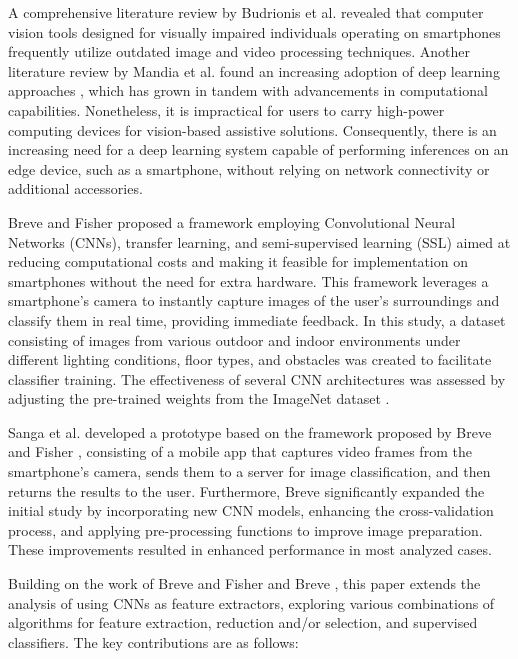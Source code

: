 \documentclass[preprint,12pt]{elsarticle}
\begin{document}
A comprehensive literature review by Budrionis et al. \cite{budrionis2022} revealed that computer vision tools designed for visually impaired individuals operating on smartphones frequently utilize outdated image and video processing techniques. Another literature review by Mandia et al. \cite{mandia2023} found an increasing adoption of deep learning approaches \cite{lecun2015,goodfellow2016,schmidhuber2015}, which has grown in tandem with advancements in computational capabilities. Nonetheless, it is impractical for users to carry high-power computing devices for vision-based assistive solutions. Consequently, there is an increasing need for a deep learning system capable of performing inferences on an edge device, such as a smartphone, without relying on network connectivity or additional accessories.

Breve and Fisher \cite{breve2020} proposed a framework employing Convolutional Neural Networks (CNNs), transfer learning, and semi-supervised learning (SSL) aimed at reducing computational costs and making it feasible for implementation on smartphones without the need for extra hardware. This framework leverages a smartphone's camera to instantly capture images of the user's surroundings and classify them in real time, providing immediate feedback. In this study, a dataset consisting of images from various outdoor and indoor environments under different lighting conditions, floor types, and obstacles was created to facilitate classifier training. The effectiveness of several CNN architectures was assessed by adjusting the pre-trained weights from the ImageNet dataset \cite{russakovsky2015}.

Sanga et al. \cite{sanga2023} developed a prototype based on the framework proposed by Breve and Fisher \cite{breve2020}, consisting of a mobile app that captures video frames from the smartphone's camera, sends them to a server for image classification, and then returns the results to the user. Furthermore, Breve \cite{breve2023} significantly expanded the initial study by incorporating new CNN models, enhancing the cross-validation process, and applying pre-processing functions to improve image preparation. These improvements resulted in enhanced performance in most analyzed cases.

Building on the work of Breve and Fisher \cite{breve2020} and Breve \cite{breve2023}, this paper extends the analysis of using CNNs as feature extractors, exploring various combinations of algorithms for feature extraction, reduction and/or selection, and supervised classifiers. The key contributions are as follows:
\end{document}
